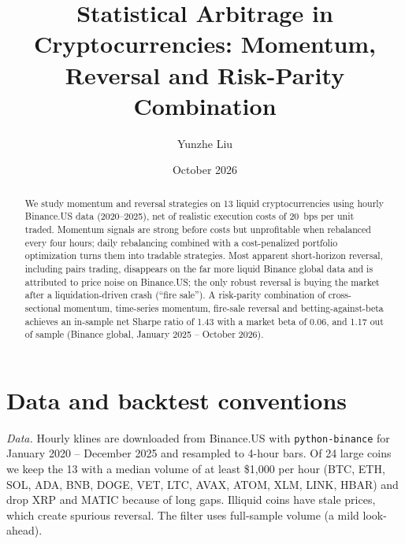 \documentclass[aps,prl,onecolumn,superscriptaddress,nofootinbib]{revtex4-2}
\begin{document}
	
	\title{Statistical Arbitrage in Cryptocurrencies: Momentum, Reversal and Risk-Parity Combination}
	\author{Yunzhe Liu}
	\date{October 2026}
	
	\begin{abstract}
		We study momentum and reversal strategies on 13 liquid cryptocurrencies using hourly Binance.US data (2020--2025), net of realistic execution costs of 20~bps per unit traded. Momentum signals are strong before costs but unprofitable when rebalanced every four hours; daily rebalancing combined with a cost-penalized portfolio optimization turns them into tradable strategies. Most apparent short-horizon reversal, including pairs trading, disappears on the far more liquid Binance global data and is attributed to price noise on Binance.US; the only robust reversal is buying the market after a liquidation-driven crash (``fire sale''). A risk-parity combination of cross-sectional momentum, time-series momentum, fire-sale reversal and betting-against-beta achieves an in-sample net Sharpe ratio of 1.43 with a market beta of 0.06, and 1.17 out of sample (Binance global, January 2025 -- October 2026).
	\end{abstract}%
	
	\maketitle
	
	
	\section{Data and backtest conventions}
	\label{app:data}
	
	\textit{Data.} Hourly klines are downloaded from Binance.US with \texttt{python-binance} for January 2020 -- December 2025 and resampled to 4-hour bars. Of 24 large coins we keep the 13 with a median volume of at least \$1{,}000 per hour (BTC, ETH, SOL, ADA, BNB, DOGE, VET, LTC, AVAX, ATOM, XLM, LINK, HBAR) and drop XRP and MATIC because of long gaps. Illiquid coins have stale prices, which create spurious reversal. The filter uses full-sample volume (a mild look-ahead).
	
\end{document}
